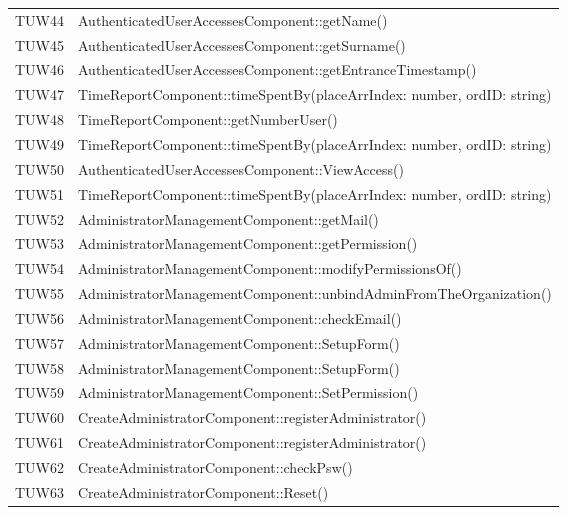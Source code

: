 {\begin{longtable}{C{2cm} C{12cm}}
		TUW44 & AuthenticatedUserAccessesComponent::getName() \\
		TUW45 & AuthenticatedUserAccessesComponent::getSurname() \\
		TUW46 & AuthenticatedUserAccessesComponent::getEntranceTimestamp() \\
		TUW47 & TimeReportComponent::timeSpentBy(placeArrIndex: number, ordID: string) \\
		TUW48 & TimeReportComponent::getNumberUser() \\
		TUW49 & TimeReportComponent::timeSpentBy(placeArrIndex: number, ordID: string) \\
		TUW50 & AuthenticatedUserAccessesComponent::ViewAccess() \\
		TUW51 & TimeReportComponent::timeSpentBy(placeArrIndex: number, ordID: string) \\
		TUW52 & AdministratorManagementComponent::getMail() \\
		TUW53 & AdministratorManagementComponent::getPermission() \\
		TUW54 & AdministratorManagementComponent::modifyPermissionsOf() \\
		TUW55 & AdministratorManagementComponent::unbindAdminFromTheOrganization() \\
		TUW56 & AdministratorManagementComponent::checkEmail() \\
		TUW57 & AdministratorManagementComponent::SetupForm() \\
		TUW58 & AdministratorManagementComponent::SetupForm() \\
		TUW59 & AdministratorManagementComponent::SetPermission() \\
		TUW60 & CreateAdministratorComponent::registerAdministrator() \\
		TUW61 & CreateAdministratorComponent::registerAdministrator() \\
		TUW62 & CreateAdministratorComponent::checkPsw() \\
		TUW63 & CreateAdministratorComponent::Reset() \\
		
	\end{longtable}
}